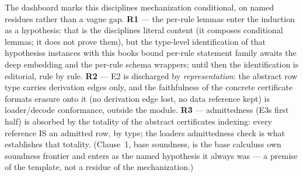\begin{bremark}
The dashboard marks this discipline\textquotesingle s mechanization
conditional, on named residues rather than a vague gap.
\textbf{R1} --- the per-rule lemmas enter the induction as a
hypothesis: that is the discipline\textquotesingle s literal content
(it composes conditional lemmas; it does not prove them), but the
type-level identification of that hypothesis\textquotesingle s
instances with this book\textquotesingle s bound per-rule statement
family awaits the deep embedding and the per-rule schema wrappers;
until then the identification is editorial, rule by rule.
\textbf{R2} --- E2 is discharged by \emph{representation}: the
abstract row type carries derivation edges only, and the faithfulness
of the concrete certificate format\textquotesingle s erasure onto it
(no derivation edge lost, no data reference kept) is loader/decode
conformance, outside the module. \textbf{R3} --- admittedness
(E3\textquotesingle s first half) is absorbed by the totality of the
abstract certificate\textquotesingle s indexing: every reference IS an
admitted row, by type; the loader\textquotesingle s admittedness check
is what establishes that totality. (Clause~1, base soundness, is the
base calculus\textquotesingle s own soundness frontier and enters as
the named hypothesis it always was --- a premise of the template, not
a residue of the mechanization.)
\end{bremark}
